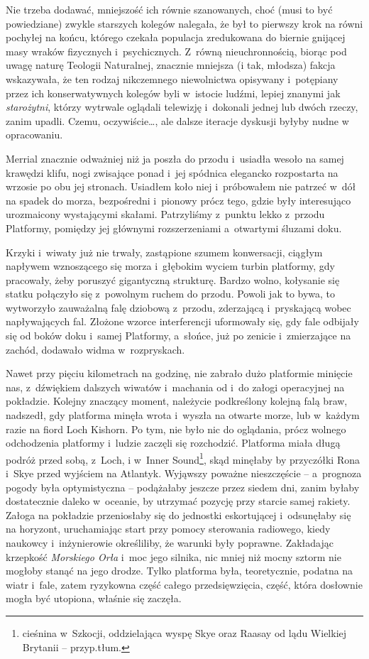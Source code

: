 \documentclass[oneside,polish,11pt,sfheadings]{mwbk}
\begin{document}
Nie trzeba dodawać, mniejszość ich równie szanowanych, choć (musi to być
powiedziane) zwykle starszych kolegów nalegała, że był to pierwszy krok
na równi pochyłej na końcu, którego czekała populacja zredukowana do
biernie gnijącej masy wraków fizycznych i~psychicznych. Z~równą
nieuchronnością, biorąc pod uwagę naturę Teologii Naturalnej, znacznie
mniejsza (i tak, młodsza) fakcja wskazywała, że ten rodzaj nikczemnego
niewolnictwa opisywany i~potępiany przez ich konserwatywnych kolegów
byli w~istocie ludźmi, lepiej znanymi jak \textit{starożytni}, którzy
wytrwale oglądali telewizję i~dokonali jednej lub dwóch rzeczy, zanim
upadli. Czemu, oczywiście\ldots, ale dalsze iteracje dyskusji byłyby nudne
w opracowaniu.

Merrial znacznie odważniej niż ja poszła do przodu i~usiadła wesoło na
samej krawędzi klifu, nogi zwisające ponad i~jej spódnica elegancko
rozpostarta na wrzosie po obu jej stronach. Usiadłem koło niej i~próbowałem nie patrzeć w~dół na spadek do morza, bezpośredni i~pionowy
prócz tego, gdzie były interesująco urozmaicony wystającymi skałami.
Patrzyliśmy z~punktu lekko z~przodu Platformy, pomiędzy jej głównymi
rozszerzeniami a~otwartymi śluzami doku.

Krzyki i~wiwaty już nie trwały, zastąpione szumem konwersacji, ciągłym
napływem wznoszącego się morza i~głębokim wyciem turbin platformy, gdy
pracowały, żeby poruszyć gigantyczną strukturę. Bardzo wolno, kołysanie
się statku połączyło się z~powolnym ruchem do przodu. Powoli jak to
bywa, to wytworzyło zauważalną falę dziobową z~przodu, zderzającą i~pryskającą wobec napływających fal. Złożone wzorce interferencji
uformowały się, gdy fale odbijały się od boków doku i~samej Platformy, a~słońce, już po zenicie i~zmierzające na zachód, dodawało widma w~rozpryskach.

Nawet przy pięciu kilometrach na godzinę, nie zabrało dużo platformie
minięcie nas, z~dźwiękiem dalszych wiwatów i~machania od i~do załogi
operacyjnej na pokładzie. Kolejny znaczący moment, należycie podkreślony
kolejną falą braw, nadszedł, gdy platforma minęła wrota i~wyszła na
otwarte morze, lub w~każdym razie na fiord Loch Kishorn. Po tym, nie
było nic do oglądania, prócz wolnego odchodzenia platformy i~ludzie
zaczęli się rozchodzić. Platforma miała długą podróż przed sobą, z~Loch,
i w~Inner Sound\footnote{cieśnina w~Szkocji, oddzielająca wyspę Skye oraz
Raasay od lądu Wielkiej Brytanii -- przyp.tłum.}, skąd minęłaby by
przyczółki Rona i~Skye przed wyjściem na Atlantyk. Wyjąwszy poważne
nieszczęście -- a~prognoza pogody była optymistyczna -- podążałaby jeszcze
przez siedem dni, zanim byłaby dostatecznie daleko w~oceanie, by
utrzymać pozycję przy starcie samej rakiety. Załoga na pokładzie
przeniosłaby się do jednostki eskortującej i~odsunęłaby się na horyzont,
uruchamiając start przy pomocy sterowania radiowego, kiedy naukowcy i~inżynierowie określiliby, że warunki były poprawne. Zakładając krzepkość
\textit{Morskiego Orła} i~moc jego silnika, nic mniej niż mocny sztorm nie
mogłoby stanąć na jego drodze. Tylko platforma była, teoretycznie,
podatna na wiatr i~fale, zatem ryzykowna część całego przedsięwzięcia,
część, która dosłownie mogła być utopiona, właśnie się zaczęła.
\end{document}
